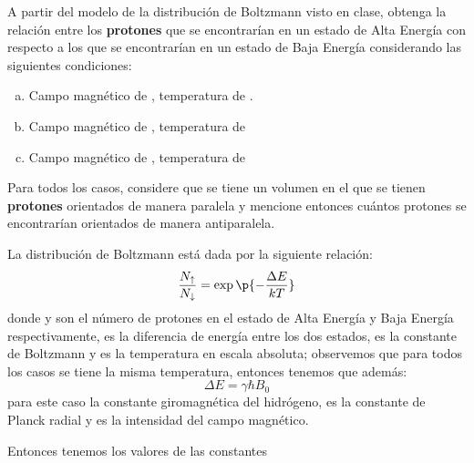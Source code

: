 \newlength{\strutheight}
\settoheight{\strutheight}{\strut}


A partir del modelo de la distribución de Boltzmann visto en clase, obtenga la relación entre los \textbf{protones} que se encontrarían en un estado de Alta Energía con respecto a los que se encontrarían en un estado de Baja Energía considerando las siguientes condiciones:
\begin{enumerate}[(a)]
  \item Campo magnético de , temperatura de .
  \item Campo magnético de , temperatura de 
  \item Campo magnético de , temperatura de 
\end{enumerate}
Para todos los casos, considere que se tiene un volumen en el que se tienen  \textbf{protones} orientados de manera paralela y mencione entonces cuántos protones se encontrarían orientados de manera antiparalela.
\bigskip\bigskip



La distribución de Boltzmann está dada por la siguiente relación:
\begin{equation}
  \dfrac{N_\uparrow}{N_\downarrow}=\exp\p{-\dfrac{\Delta E}{kT}}
  \label{eq:distribution}
\end{equation}
donde  y  son el número de protones en el estado de Alta Energía y Baja Energía respectivamente,  es la diferencia de energía entre los dos estados,   es la constante de Boltzmann y  es la temperatura en escala absoluta; observemos que para todos los casos se tiene la misma temperatura,  entonces tenemos que
además:
\begin{equation}
  \Delta E=\gamma\hbar B_0
  \label{eq:e}
\end{equation}
para este caso  la constante giromagnética del hidrógeno, \ec{\hbar} es la constante de Planck radial y  es la intensidad del campo magnético.

Entonces tenemos los valores de las constantes

